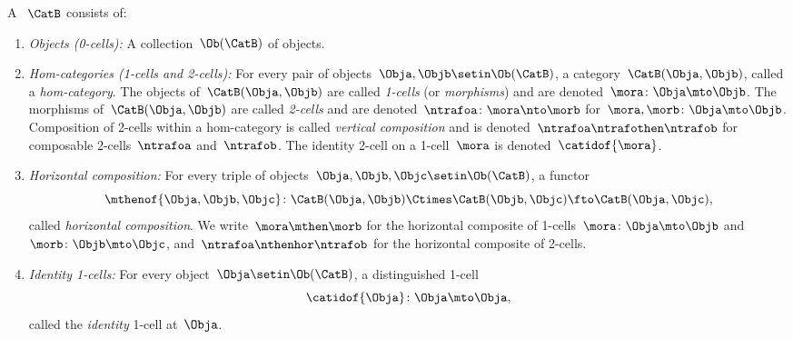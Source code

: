 \begin{ctdefinition}[Bicategory]
    \label{def:bicategory}
    A ~$\CatB$ consists of:

    \constit

    \begin{enumerate}
        \item \label{bicat-objects}
              \emph{Objects (0-cells):}
              A collection~$\Ob(\CatB)$ of objects.

        \item \label{bicat-hom-cats}
              \emph{Hom-categories (1-cells and 2-cells):}
              For every pair of objects~$\Obja, \Objb \setin \Ob(\CatB)$, a category~$\CatB(\Obja, \Objb)$, called a \emph{hom-category}.
              The objects of~$\CatB(\Obja, \Objb)$ are called \emph{1-cells} (or \emph{morphisms}) and are denoted~$\mora \colon \Obja \mto \Objb$.
              The morphisms of~$\CatB(\Obja, \Objb)$ are called \emph{2-cells} and are denoted~$\ntrafoa \colon \mora \nto \morb$ for~$\mora, \morb \colon \Obja \mto \Objb$.
              Composition of 2-cells within a hom-category is called \emph{vertical composition} and is denoted~$\ntrafoa \ntrafothen \ntrafob$ for composable 2-cells~$\ntrafoa$ and~$\ntrafob$.
              The identity 2-cell on a 1-cell~$\mora$ is denoted~$\catidof{\mora}$.

        \item \label{bicat-horizontal-comp}
              \emph{Horizontal composition:}
              For every triple of objects~$\Obja, \Objb, \Objc \setin \Ob(\CatB)$, a functor
              \begin{equation}\label{eq:bicat-horiz-comp}
                  \mthenof{\Obja,\Objb,\Objc} \colon \CatB(\Obja, \Objb) \Ctimes \CatB(\Objb, \Objc) \fto \CatB(\Obja, \Objc),
              \end{equation}
              called \emph{horizontal composition}.
              We write~$\mora \mthen \morb$ for the horizontal composite of 1-cells~$\mora\colon \Obja \mto \Objb$ and~$\morb\colon \Objb \mto \Objc$, and~$\ntrafoa \nthenhor \ntrafob$ for the horizontal composite of 2-cells.

        \item \label{bicat-identities}
              \emph{Identity 1-cells:}
              For every object~$\Obja \setin \Ob(\CatB)$, a distinguished 1-cell
              \begin{equation}\label{eq:bicat-identity-cell}
                  \catidof{\Obja} \colon \Obja \mto \Obja,
              \end{equation}
              called the \emph{identity} 1-cell at~$\Obja$.


\end{enumerate}
\end{ctdefinition}
